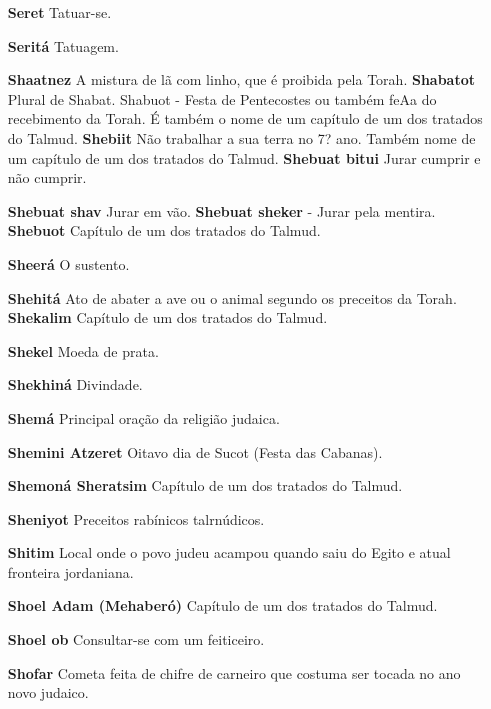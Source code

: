\begin{itemize}
\item[\textbf{Seret}] Tatuar-se.

\item[\textbf{Seritá}] Tatuagem.

\item[\textbf{Shaatnez}] A mistura de lã com linho, que é proibida pela
Torah. \textbf{Shabatot} Plural de Shabat. Shabuot - Festa de
Pentecostes ou também feAa do recebimento da To­rah. É também o nome de
um capítu­lo de um dos tratados do Talmud. \textbf{Shebiit} Não
trabalhar a sua terra no 7? ano. Também nome de um capítu­lo de um dos
tratados do Talmud. \textbf{Shebuat bitui} Jurar cumprir e não
cumprir.

\item[\textbf{Shebuat shav} Jurar em vão. \textbf{Shebuat sheker}] - Jurar
pela mentira. \textbf{Shebuot} Capítulo de um dos trata­dos do Talmud.

\item[\textbf{Sheerá}] O sustento.

\item[\textbf{Shehitá}] Ato de abater a ave ou o ani­mal segundo os preceitos
da Torah. \textbf{Shekalim} Capítulo de um dos trata­dos do Talmud.

\item[\textbf{Shekel}] Moeda de prata.

\item[\textbf{Shekhiná}] Divindade.

\item[\textbf{Shemá}] Principal oração da religião judaica.

\item[\textbf{Shemini Atzeret}] Oitavo dia de Su­cot (Festa das Cabanas).

\item[\textbf{Shemoná Sheratsim}] Capítulo de um dos tratados do Talmud.
\item[\textbf{Sheniyot}] Preceitos rabínicos talrnú­dicos.

\item[\textbf{Shitim}] Local onde o povo judeu acampou quando saiu do Egito e
atual fronteira jordaniana.

\item[\textbf{Shoel Adam (Mehaberó)}] Capítulo de um dos tratados do Talmud.
\item[\textbf{Shoel ob}] Consultar-se com um feiti­ceiro.

\item[\textbf{Shofar}] Cometa feita de chifre de car­neiro que costuma ser
tocada no ano novo judaico.


\end{itemize}
